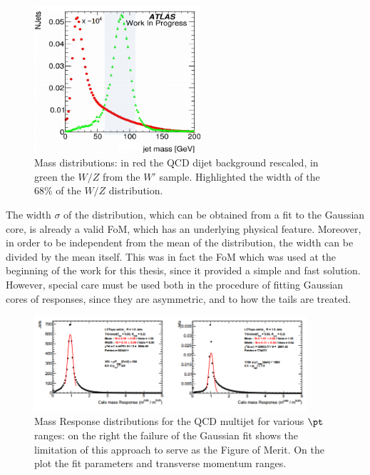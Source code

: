 \begin{figure}[!ht]
  \centering
      \includegraphics[width=0.55\textwidth]{jet_part/search.png}
  \caption[QCD and $W'$ mass distribution]{Mass distributions: in red the QCD dijet background rescaled, in green the $W/Z$ from the $W'$ sample. Highlighted the width of the 68\% of the $W/Z$ distribution.}
  \label{fig:search}
\end{figure}

The width $\sigma$ of the distribution, which can be obtained from a fit to the Gaussian core, is already a valid FoM, which has an underlying physical feature. Moreover, in order to be independent from the mean of the distribution, the width can be divided by the mean itself.
This was in fact the FoM which was used at the beginning of the work for this thesis, since it provided a simple and fast solution. However, special care must be used both in the procedure of fitting Gaussian cores of responses, since they are asymmetric, and to how the tails are treated.

\begin{figure}[!ht]
  \centering
      \includegraphics[width=0.9\textwidth]{jet_part/wrongsigma.png}
  \caption[Gaussian fit for QCD multijet]{Mass Response distributions for the QCD multijet for various $\pt$ ranges: on the right the failure of the Gaussian fit shows the limitation of this approach to serve as the Figure of Merit. On the plot the fit parameters and transverse momentum ranges.}
  \label{fig:wrongsigma32}
\end{figure}

